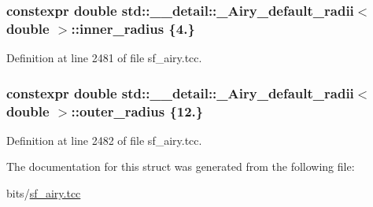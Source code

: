 \subsubsection[{\texorpdfstring{inner\+\_\+radius}{inner_radius}}]{\setlength{\rightskip}{0pt plus 5cm}constexpr double {\bf std\+::\+\_\+\+\_\+detail\+::\+\_\+\+Airy\+\_\+default\+\_\+radii}$<$ double $>$\+::inner\+\_\+radius \{4.\}\hspace{0.3cm}{\ttfamily [static]}}\hypertarget{structstd_1_1____detail_1_1__Airy__default__radii_3_01double_01_4_a1c16ae812de7fce0a39bc3b094767b87}{}\label{structstd_1_1____detail_1_1__Airy__default__radii_3_01double_01_4_a1c16ae812de7fce0a39bc3b094767b87}


Definition at line 2481 of file sf\+\_\+airy.\+tcc.

\subsubsection[{\texorpdfstring{outer\+\_\+radius}{outer_radius}}]{\setlength{\rightskip}{0pt plus 5cm}constexpr double {\bf std\+::\+\_\+\+\_\+detail\+::\+\_\+\+Airy\+\_\+default\+\_\+radii}$<$ double $>$\+::outer\+\_\+radius \{12.\}\hspace{0.3cm}{\ttfamily [static]}}\hypertarget{structstd_1_1____detail_1_1__Airy__default__radii_3_01double_01_4_a0d0c981d84c034afb18aa533bd6a9a52}{}\label{structstd_1_1____detail_1_1__Airy__default__radii_3_01double_01_4_a0d0c981d84c034afb18aa533bd6a9a52}


Definition at line 2482 of file sf\+\_\+airy.\+tcc.



The documentation for this struct was generated from the following file\+:\begin{DoxyCompactItemize}
\item 
bits/\hyperlink{sf__airy_8tcc}{sf\+\_\+airy.\+tcc}\end{DoxyCompactItemize}
